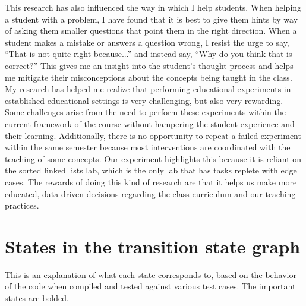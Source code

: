 \documentclass[11pt,letterpaper]{article}
\begin{document}
This research has also influenced the way in which I help students. When helping a student with a problem, I have found that it is best to give them hints by way of asking them smaller questions that point them in the right direction. When a student makes a mistake or answers a question wrong, I resist the urge to say, ``That is not quite right because...'' and instead say, ``Why do you think that is correct?'' This gives me an insight into the student's thought process and helps me mitigate their misconceptions about the concepts being taught in the class.\\

My research has helped me realize that performing educational experiments in established educational settings is very challenging, but also very rewarding. Some challenges arise from the need to perform these experiments within the current framework of the course without hampering the student experience and their learning. Additionally, there is no opportunity to repeat a failed experiment within the same semester because most interventions are coordinated with the teaching of some concepts. Our experiment highlights this because it is reliant on the sorted linked lists lab, which is the only lab that has tasks replete with edge cases. The rewards of doing this kind of research are that it helps us make more educated, data-driven decisions regarding the class curriculum and our teaching practices.


%

\appendix
\section{States in the transition state graph}
\label{sec:appendix-states}
This is an explanation of what each state corresponds to, based on the behavior of the code when compiled and tested against various test cases. The important states are bolded.
\end{document}
